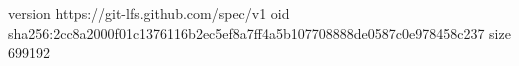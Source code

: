 version https://git-lfs.github.com/spec/v1
oid sha256:2cc8a2000f01c1376116b2ec5ef8a7ff4a5b107708888de0587c0e978458c237
size 699192
